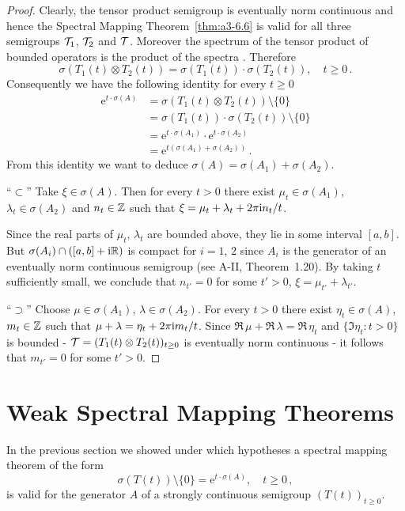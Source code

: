 \begin{proof}
Clearly, the tensor product semigroup is eventually norm continuous and hence the Spectral Mapping Theorem~\ref{thm:a3-6.6} is valid for all three semigroups $\mathcal{T}_{1}$, $\mathcal{T}_{2}$ and $\mathcal{T}$.
Moreover the spectrum of the tensor product of bounded operators is the product of the spectra \citet[XIII.9]{reedsimon:1978}.
Therefore
\[
	\sigma(T_{1}(t)\otimes T_{2}(t)) = \sigma(T_{1}(t))\cdot\sigma(T_{2}(t)), \quad t \geq 0\,.
\]
Consequently we have the following identity for every $t \geq 0$ 
\begin{align*}
\mathrm{e}^{t\cdot\sigma(A)} &= \sigma(T_{1}(t)\otimes T_{2}(t)) \setminus \{0\} \\
&= \sigma(T_{1}(t))\cdot\sigma(T_{2}(t)) \setminus \{0\} \\
&= \mathrm{e}^{t\cdot\sigma(A_{1})}\cdot \mathrm{e}^{t\cdot\sigma(A_{2})} \\
&= \mathrm{e}^{t(\sigma(A_{1})+\sigma(A_{2}))}\,.
\end{align*}
From this identity we want to deduce $\sigma(A) = \sigma(A_{1}) + \sigma(A_{2})$.

\enquote{$\subset$}\quad 
Take $\xi \in \sigma(A)$.
Then for every $t > 0$ there exist $\mu_{t} \in \sigma(A_{1})$, $\lambda_{t} \in \sigma(A_{2})$ and $n_{t} \in \mathbb{Z}$ such that $\xi = \mu_{t} + \lambda_{t} + 2\pi\mathrm{i}  n_{t}/t$.

Since the real parts of $\mu_{t}$, $\lambda_{t}$ are bounded above, they lie in some interval $[a,b]$.
But $\sigma(A_{i}) \cap ([a,b] + \mathrm{i}\mathbb{R})$ is compact for $i = 1$, $2$  since $A_{i}$ is the generator of an eventually norm continuous semigroup (see A-II, Theorem~1.20).
By taking $t$ sufficiently small, we conclude that $n_{t'} = 0$ for some $t' > 0$, \ie $\xi = \mu_{t'} + \lambda_{t'}$.

\enquote{$\supset$}\quad 
Choose $\mu \in \sigma(A_{1})$, $\lambda \in \sigma(A_{2})$.
For every $t > 0$ there exist $\eta_{t} \in \sigma(A)$, $m_{t} \in \mathbb{Z}$ such that $\mu + \lambda = \eta_{t} + 2\pi \mathrm{i} m_{t}/t$.
Since $\Re\,\mu + \Re\,\lambda = \Re\,\eta_{t}$ and $\{\Im \eta_{t}: t > 0\}$ is bounded - $\mathcal{T} = (T_{1}(t) \otimes T_{2}(t))_{t\geq 0}$ is eventually norm continuous - it follows that $m_{t'} = 0$ for some $t' > 0$.
\end{proof}
\section{Weak Spectral Mapping Theorems}\label{sec:a3-7}
In the previous section we showed under which hypotheses a spectral mapping theorem of the form
\begin{equation}\label{eq:a3-7.1}
\sigma(T(t)) \setminus \{0\} = \mathrm{e}^{t \cdot \sigma(A)}, \quad t \geq 0\,,
\end{equation}
is valid for the generator $A$ of a strongly continuous semigroup $(T(t))_{t\geq 0}$.

